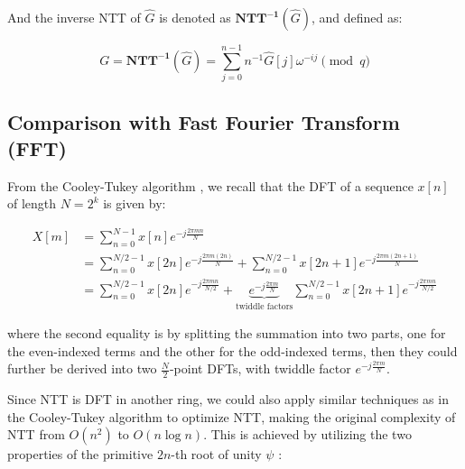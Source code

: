 \documentclass[12pt]{article}
\begin{document}
And the inverse NTT of $\hat{G}$ is denoted as $\mathbf{NTT^{-1}}(\hat{G})$, 
and defined as:

\begin{equation*}
    G = \mathbf{NTT^{-1}}(\hat{G}) = \sum_{j = 0}^{n - 1} n^{-1} \hat{G}[j] \omega^{-i j} \pmod{q}
\end{equation*}
\cite[p.~4]{fpga}

\subsection{Comparison with Fast Fourier Transform (FFT)}





From the Cooley-Tukey algorithm \cite[p.~370]{ADSP5}, 
we recall that the DFT of a sequence $x[n]$ of length $N = 2^k$ is given by:

\begin{align*}
    X[m] 
    &= \sum_{n = 0}^{N - 1} x[n] e^{-j \frac{2 \pi m n}{N}} \\
    &= \sum_{n = 0}^{N/2 - 1} x[2n] e^{-j \frac{2 \pi m (2n)}{N}} + \sum_{n = 0}^{N/2 - 1} x[2n + 1] e^{-j \frac{2 \pi m (2n + 1)}{N}} \\
    &= \sum_{n = 0}^{N/2 - 1} x[2n] e^{-j \frac{2 \pi m n}{N/2}} + \underbrace{e^{-j \frac{2 \pi m}{N}}}_{\text{twiddle factors}} \sum_{n = 0}^{N/2 - 1} x[2n + 1] e^{-j \frac{2 \pi m n}{N/2}} 
\end{align*}

where the second equality is by splitting the summation into two parts, 
one for the even-indexed terms and the other for the odd-indexed terms, 
then they could further be derived into two $\frac{N}{2}$-point DFTs, with twiddle factor $e^{-j \frac{2 \pi m}{N}}$.

Since NTT is DFT in another ring, we could also apply similar techniques as in the Cooley-Tukey algorithm to optimize NTT, 
making the original complexity of NTT from $O(n^2)$ to $O(n \log n)$. 
This is achieved by utilizing the two properties of the primitive $2n$-th root of unity $\psi$ \cite[p.~11]{beginner_guide}:
\end{document}

